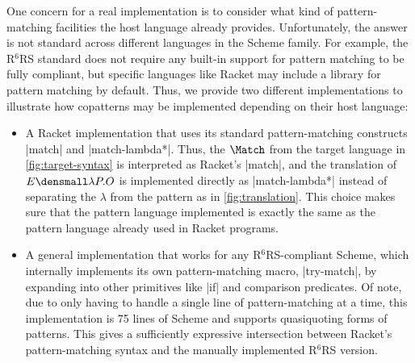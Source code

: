 One concern for a real implementation is to consider what kind of pattern-matching facilities the host language already provides.
Unfortunately, the answer is not standard across different languages in the Scheme family.
For example, the R${}^6$RS standard does not require any built-in support for pattern matching to be fully compliant, but specific languages like Racket may include a library for pattern matching by default.
Thus, we provide two different implementations to illustrate how copatterns may be implemented depending on their host language:
\begin{itemize}
\item
  A Racket implementation that uses its standard pattern-matching constructs \rkt|match| and \rkt|match-lambda*|.
  Thus, the $\Match$  from the target language in \cref{fig:target-syntax} is interpreted as Racket's \rkt|match|, and the translation of $E\den{\lambda P. O}$ is implemented directly as \rkt|match-lambda*| instead of separating the $\lambda$ from the pattern as in \cref{fig:translation}.
  This choice makes sure that the pattern language implemented is exactly the same as the pattern language already used in Racket programs.
\item
  A general implementation that works for any R${}^6$RS-compliant Scheme, which internally implements its own pattern-matching macro, \scm|try-match|, by expanding into other primitives like \scm|if| and comparison predicates.
  Of note, due to only having to handle a single line of pattern-matching at a time, this implementation is 75 lines of Scheme and supports quasiquoting forms of patterns.
  This gives a sufficiently expressive intersection between Racket's pattern-matching syntax and the manually implemented R${}^6$RS version.
\end{itemize}


